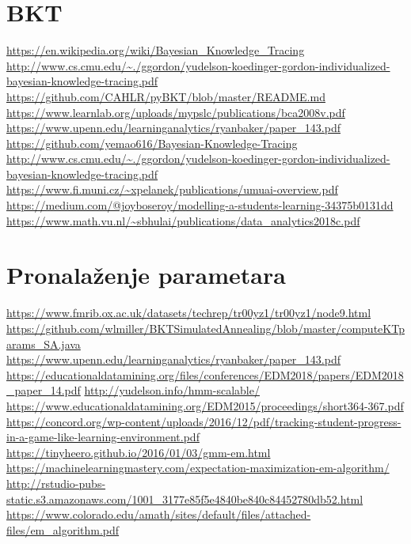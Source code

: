 \documentclass[utf8]{report}
\begin{document}
	\section{BKT}
	\url{https://en.wikipedia.org/wiki/Bayesian_Knowledge_Tracing}\newline
	\url{http://www.cs.cmu.edu/~./ggordon/yudelson-koedinger-gordon-individualized-bayesian-knowledge-tracing.pdf}\newline
	\url{https://github.com/CAHLR/pyBKT/blob/master/README.md}\newline
	\url{https://www.learnlab.org/uploads/mypslc/publications/bca2008v.pdf}\newline
	\url{https://www.upenn.edu/learninganalytics/ryanbaker/paper_143.pdf}\newline
	\url{https://github.com/yemao616/Bayesian-Knowledge-Tracing}\newline
	\url{http://www.cs.cmu.edu/~./ggordon/yudelson-koedinger-gordon-individualized-bayesian-knowledge-tracing.pdf}\newline
	\url{https://www.fi.muni.cz/~xpelanek/publications/umuai-overview.pdf}\newline
	\url{https://medium.com/@joyboseroy/modelling-a-students-learning-34375b0131dd}\newline
	\url{https://www.math.vu.nl/~sbhulai/publications/data_analytics2018c.pdf}\newline
	\section{Pronalaženje parametara}
	\url{https://www.fmrib.ox.ac.uk/datasets/techrep/tr00yz1/tr00yz1/node9.html}\newline
	\url{https://github.com/wlmiller/BKTSimulatedAnnealing/blob/master/computeKTparams_SA.java}\newline
	\url{https://www.upenn.edu/learninganalytics/ryanbaker/paper_143.pdf}\newline
	\url{https://educationaldatamining.org/files/conferences/EDM2018/papers/EDM2018_paper_14.pdf}\newline
	\url{http://yudelson.info/hmm-scalable/}\newline
	\url{https://www.educationaldatamining.org/EDM2015/proceedings/short364-367.pdf}\newline
	\url{https://concord.org/wp-content/uploads/2016/12/pdf/tracking-student-progress-in-a-game-like-learning-environment.pdf}\newline
	\url{https://tinyheero.github.io/2016/01/03/gmm-em.html}\newline
	\url{https://machinelearningmastery.com/expectation-maximization-em-algorithm/}\newline
	\url{http://rstudio-pubs-static.s3.amazonaws.com/1001_3177e85f5e4840be840c84452780db52.html}\newline
	\url{https://www.colorado.edu/amath/sites/default/files/attached-files/em_algorithm.pdf}
\end{document}
